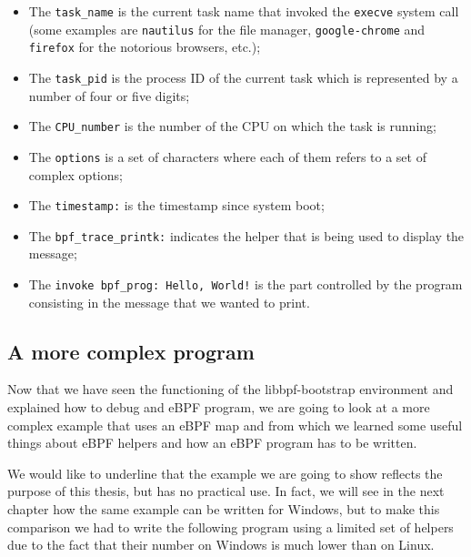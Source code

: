 \begin{itemize}
	\item 
		The \colorbox{backcolour}{\lstinline[style=highlight, language=bash]|task_name|} is the current task name that invoked the \colorbox{backcolour}{\lstinline[style=highlight, language=bash]|execve|} system call (some examples are \colorbox{backcolour}{\lstinline[style=highlight, language=bash]|nautilus|} for the file manager, \colorbox{backcolour}{\lstinline[style=highlight, language=bash]|google-chrome|} and \colorbox{backcolour}{\lstinline[style=highlight, language=bash]|firefox|} for the notorious browsers, etc.);
	\item 
		The \colorbox{backcolour}{\lstinline[style=highlight, language=bash]|task_pid|} is the process ID of the current task which is represented by a number of four or five digits;
	\item 
		The \colorbox{backcolour}{\lstinline[style=highlight, language=bash]|CPU_number|} is the number of the CPU on which the task is running;
	\item 
		The \colorbox{backcolour}{\lstinline[style=highlight, language=bash]|options|} is a set of characters where each of them refers to a set of complex options;
	\item 
		The \colorbox{backcolour}{\lstinline[style=highlight, language=bash]|timestamp:|} is the timestamp since system boot;
	\item 
		The \colorbox{backcolour}{\lstinline[style=highlight, language=bash]|bpf_trace_printk:|} indicates the helper that is being used to display the message;
	\item 
		The \colorbox{backcolour}{\lstinline[style=highlight, language=bash]|invoke bpf_prog: Hello, World!|} is the part controlled by the program consisting in the message that we wanted to print.
\end{itemize}

\subsection{A more complex program}

Now that we have seen the functioning of the libbpf-bootstrap environment and explained how to debug and eBPF program, we are going to look at a more complex example that uses an eBPF map and from which we learned some useful things about eBPF helpers and how an eBPF program has to be written.

We would like to underline that the example we are going to show reflects the purpose of this thesis, but has no practical use.
In fact, we will see in the next chapter how the same example can be written for Windows, but to make this comparison we had to write the following program using a limited set of helpers due to the fact that their number on Windows is much lower than on Linux.

